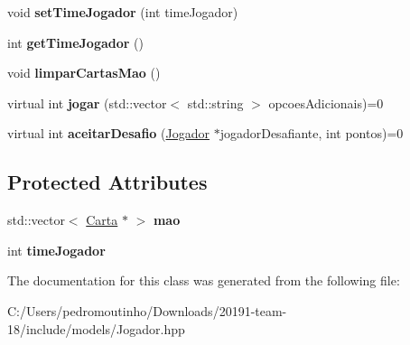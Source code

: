 \begin{DoxyCompactItemize}
void {\bfseries set\+Time\+Jogador} (int time\+Jogador)
\item 
\mbox{\label{class_jogador_a6445980bae531aaca239735557140ffa}} 
int {\bfseries get\+Time\+Jogador} ()
\item 
\mbox{\label{class_jogador_ae9be28c426f205bb1496d38324befc62}} 
void {\bfseries limpar\+Cartas\+Mao} ()
\item 
\mbox{\label{class_jogador_a8af760d8531f7d4e78fc767adcff0cb6}} 
virtual int {\bfseries jogar} (std\+::vector$<$ std\+::string $>$ opcoes\+Adicionais)=0
\item 
\mbox{\label{class_jogador_a4eceb45cff559f97cd441da30d36769c}} 
virtual int {\bfseries aceitar\+Desafio} (\mbox{\hyperlink{class_jogador}{Jogador}} $\ast$jogador\+Desafiante, int pontos)=0
\end{DoxyCompactItemize}
\subsection*{Protected Attributes}
\begin{DoxyCompactItemize}
\item 
\mbox{\label{class_jogador_ad989cab8e9aa172ddb6ed89d019a7e91}} 
std\+::vector$<$ \mbox{\hyperlink{class_carta}{Carta}} $\ast$ $>$ {\bfseries mao}
\item 
\mbox{\label{class_jogador_a799f588b8a5c2504c6a290e617983808}} 
int {\bfseries time\+Jogador}
\end{DoxyCompactItemize}


The documentation for this class was generated from the following file\+:\begin{DoxyCompactItemize}
\item 
C\+:/\+Users/pedromoutinho/\+Downloads/20191-\/team-\/18/include/models/Jogador.\+hpp\end{DoxyCompactItemize}

